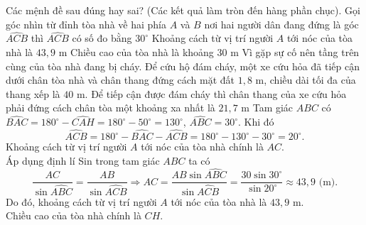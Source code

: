 \begin{ex}
{
}
Các mệnh đề sau đúng hay sai? (Các kết quả làm tròn đến hàng phần chục).
\choiceTF
{Gọi góc nhìn từ đỉnh tòa nhà về hai phía $A$ và $B$ nơi hai người dân đang đứng là góc $\widehat{ACB}$ thì $\widehat{ACB}$ có số đo bằng $30^\circ$}
{\True Khoảng cách từ vị trí người $A$ tới nóc của tòa nhà là $43{,}9$ m}
{Chiều cao của tòa nhà là khoảng $30$ m}
{Vì gặp sự cố nên tầng trên cùng của tòa nhà đang bị cháy. Để cứu hộ đám cháy, một xe cứu hỏa đã tiếp cận dưới chân tòa nhà và chân thang đứng cách mặt đất $1{,}8$ m, chiều dài tối đa của thang xếp là $40$ m. Để tiếp cận được đám cháy thì chân thang của xe cứu hỏa phải đứng cách chân tòa một khoảng xa nhất là $21{,}7$ m}
\loigiai
{
Tam giác $ABC$ có $\widehat{BAC} = 180^\circ-\widehat{CAH} = 180^\circ-50^\circ = 130^\circ$, $\widehat{ABC} = 30^\circ$. Khi đó
\[\widehat{ACB} = 180^\circ-\widehat{BAC} -\widehat{ACB} = 180^\circ - 130^\circ - 30^\circ = 20^\circ.\]
Khoảng cách từ vị trí người $A$ tới nóc của tòa nhà chính là $AC$.\\
Áp dụng định lí Sin trong tam giác $ABC$ ta có
\[\dfrac{AC}{\sin \widehat{ABC}} = \dfrac{AB}{\sin \widehat{ACB}} \Rightarrow AC = \dfrac{AB\sin \widehat{ABC}}{\sin \widehat{ACB}} = \dfrac{30\sin 30^\circ}{\sin 20^\circ} \approx 43{,}9 \text{ (m)}.\]
Do đó, khoảng cách từ vị trí người $A$ tới nóc của tòa nhà là $43{,}9 \text{ m}$.\\
Chiều cao của tòa nhà chính là $CH$.\\
}
\end{ex}
